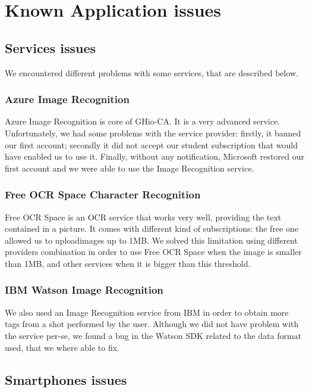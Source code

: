 \section{Known Application issues}
\label{sec:issues}

\subsection{Services issues}

We encountered different problems with some services, that are described below.

\subsubsection{Azure Image Recognition}

Azure Image Recognition is core of GHio-CA. It is a very advanced service. 
Unfortunately, we had some problems with the service provider: firstly, it 
banned our first account; secondly it did not accept our student subscription 
that would have enabled us to use it. Finally, without any notification, 
Microsoft restored our first account and we were able to use the Image 
Recognition service.

\subsubsection{Free OCR Space Character Recognition}

Free OCR Space is an OCR service that works very well, providing the text 
contained in a picture. It comes with different kind of subscriptions: the free 
one allowed us to uploadimages up to 1MB. We solved this limitation using 
different providers combination in order to use Free OCR Space when the image is 
smaller than 1MB, and other services when it is bigger than this threshold.

\subsubsection{IBM Watson Image Recognition}

We also used an Image Recognition service from IBM in order to obtain more tags 
from a shot performed by the user. Although we did not have problem with the 
service per-se, we found a bug in the Watson SDK related to the data format 
used, that we where able to fix.

\subsection{Smartphones issues}

